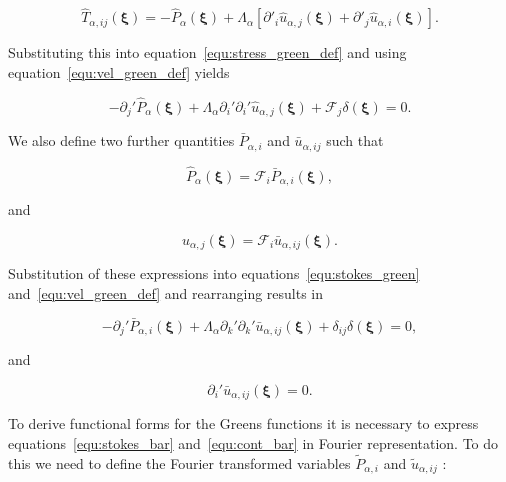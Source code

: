 \documentclass[12pt]{article}
\begin{document}
\begin{equation}
\label{equ:press_green_def}
\hat{T}_{\alpha, ij}(\boldsymbol{\xi}) = - \hat{P}_{\alpha}(\boldsymbol{\xi}) + \Lambda_{\alpha}[\partial'_{i} \hat{u}_{\alpha,j}(\boldsymbol{\xi}) + \partial'_{j} \hat{u}_{\alpha,i}(\boldsymbol{\xi})] .
\end{equation}


Substituting this into equation~\ref{equ:stress_green_def} and using equation~\ref{equ:vel_green_def} yields 

\begin{equation}
\label{equ:stokes_green}
-\partial_{j}' \hat{P}_{\alpha}(\boldsymbol{\xi}) + \Lambda_{\alpha} \partial_{i}' \partial_{i}' \hat{u}_{\alpha,j}(\boldsymbol{\xi}) + \mathcal{F}_{j} \delta(\boldsymbol{\xi}) = 0 .
\end{equation}


We also define two further quantities $\bar{P}_{\alpha, i}$ and $\bar{u}_{\alpha,ij}$ such that

\begin{equation}
\label{equ:pres_bar}
\hat{P}_{\alpha} (\boldsymbol{\xi}) = \mathcal{F}_{i} \bar{P}_{\alpha, i} (\boldsymbol{\xi}) ,
\end{equation}

and 

\begin{equation}
\label{equ:vel_bar}
\hat{u}_{\alpha,j}(\boldsymbol{\xi}) = \mathcal{F}_{i} \bar{u}_{\alpha,ij} (\boldsymbol{\xi}) .
\end{equation}

Substitution of these expressions into equations~\ref{equ:stokes_green} and~\ref{equ:vel_green_def} and rearranging results in

\begin{equation}
\label{equ:stokes_bar}
-\partial_{j}' \bar{P}_{\alpha, i} (\boldsymbol\xi) + \Lambda_{\alpha} \partial_{k}' \partial_{k}' \bar{u}_{\alpha,ij} (\boldsymbol\xi) + \delta_{ij} \delta(\boldsymbol\xi) = 0 ,
\end{equation}

and

\begin{equation}
\label{equ:cont_bar}
\partial_{i}' \bar{u}_{\alpha,ij} (\boldsymbol\xi)  = 0 .
\end{equation}


To derive functional forms for the Greens functions it is necessary to express equations~\ref{equ:stokes_bar} and~\ref{equ:cont_bar} in Fourier representation. To do this we need to define the Fourier transformed variables $\tilde{P}_{\alpha, i}$ and $\tilde{u}_{\alpha,ij}$ \cite{Riley06}:
\end{document}
